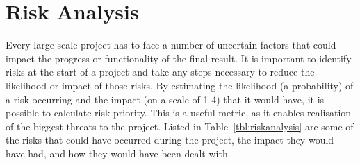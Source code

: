\documentclass[11pt,a4paper]{report}
\begin{document}
\section{Risk Analysis}
Every large-scale project has to face a number of uncertain factors that could impact the progress or functionality of the final result. It is important to identify risks at the start of a project and take any steps necessary to reduce the likelihood or impact of those risks. By estimating the likelihood (a probability) of a risk occurring and the impact (on a scale of 1-4) that it would have, it is possible to calculate risk priority. This is a useful metric, as it enables realisation of the biggest threats to the project. Listed in Table~\ref{tbl:riskanalysis} are some of the risks that could have occurred during the project, the impact they would have had, and how they would have been dealt with.
\end{document}
